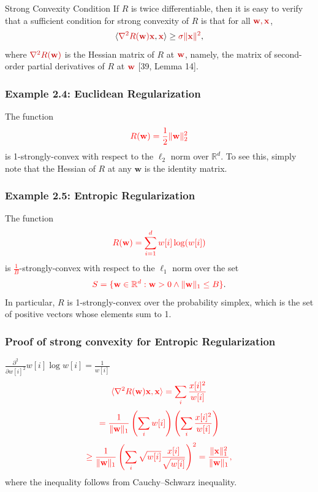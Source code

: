 \documentclass[handout]{beamer}
\newcommand{\redmath}[1]{\textcolor{mathred}{#1}}
\begin{document}
\begin{frame}{Strong Convexity Condition}
    If \( R \) is twice differentiable, then it is easy to verify that a sufficient condition for strong convexity of \( R \) is that for all \( \redmath{\mathbf{w}, \mathbf{x}} \),
    \[
    \langle \redmath{\nabla^2 R(\mathbf{w}) \mathbf{x}}, \redmath{\mathbf{x}} \rangle \geq \redmath{\sigma \|\mathbf{x}\|^2},
    \]
    where \( \redmath{\nabla^2 R(\mathbf{w})} \) is the Hessian matrix of \( R \) at \( \redmath{\mathbf{w}} \), namely, the matrix of second-order partial derivatives of \( R \) at \( \redmath{\mathbf{w}} \) [39, Lemma 14].
\end{frame}


\begin{frame}
    \frametitle{Example 2.4: Euclidean Regularization}
    The function 
    \[
    \textcolor{red}{R(\mathbf{w}) = \frac{1}{2} \|\mathbf{w}\|_2^2}
    \]
    is 1-strongly-convex with respect to the $\ell_2$ norm over $\mathbb{R}^d$. To see this, simply note that the Hessian of $R$ at any $\mathbf{w}$ is the identity matrix.
\end{frame}

\begin{frame}
    \frametitle{Example 2.5: Entropic Regularization}
    The function 
    \[
    \textcolor{red}{R(\mathbf{w}) = \sum_{i=1}^{d} w[i] \log(w[i])}
    \]
    is \textcolor{red}{$\frac{1}{B}$}-strongly-convex with respect to the $\ell_1$ norm over the set 
    \[
    \textcolor{red}{S = \{\mathbf{w} \in \mathbb{R}^d : \mathbf{w} > 0 \wedge \|\mathbf{w}\|_1 \leq B\}}.
    \]
    In particular, $R$ is 1-strongly-convex over the probability simplex, which is the set of positive vectors whose elements sum to 1.
\end{frame}

\begin{frame}
    \frametitle{Proof of strong convexity for Entropic Regularization}
    $\frac{\partial^2}{\partial w[i]^2} w[i] \log w[i] = \frac{1}{w[i]}$ 
    \[
    \textcolor{red}{\langle \nabla^2 R(\mathbf{w})\mathbf{x},\mathbf{x} \rangle = \sum_i \frac{x[i]^2}{w[i]}}
    \]
    \[
    \textcolor{red}{= \frac{1}{\|\mathbf{w}\|_1} \left(\sum_i w[i] \right) \left(\sum_i \frac{x[i]^2}{w[i]} \right)}
    \]
    \[
    \textcolor{red}{\geq \frac{1}{\|\mathbf{w}\|_1} \left(\sum_i \sqrt{w[i]} \frac{x[i]}{\sqrt{w[i]}} \right)^2 = \frac{\|\mathbf{x}\|_1^2}{\|\mathbf{w}\|_1},}
    \]
    where the inequality follows from Cauchy–Schwarz inequality.
\end{frame}
\end{document}
